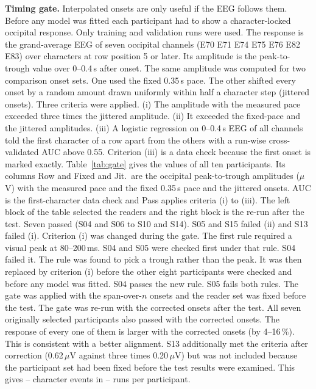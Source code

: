 \documentclass[sigconf]{acmart}
\begin{document}
\textbf{Timing gate.} Interpolated onsets are only useful if the EEG follows them. Before any model was fitted each participant had to show a character-locked occipital response. Only training and validation runs were used. The response is the grand-average EEG of seven occipital channels (E70 E71 E74 E75 E76 E82 E83) over characters at row position 5 or later. Its amplitude is the peak-to-trough value over 0--0.4\,s after onset. The same amplitude was computed for two comparison onset sets. One used the fixed 0.35\,s pace. The other shifted every onset by a random amount drawn uniformly within half a character step (jittered onsets). Three criteria were applied. (i) The amplitude with the measured pace exceeded three times the jittered amplitude. (ii) It exceeded the fixed-pace and the jittered amplitudes. (iii) A logistic regression on 0--0.4\,s EEG of all channels told the first character of a row apart from the others with a run-wise cross-validated AUC above 0.55. Criterion (iii) is a data check because the first onset is marked exactly. Table~\ref{tab:gate} gives the values of all ten participants. Its columns Row and Fixed and Jit.\ are the occipital peak-to-trough amplitudes ($\mu$V) with the measured pace and the fixed 0.35\,s pace and the jittered onsets. AUC is the first-character data check and Pass applies criteria (i) to (iii). The left block of the table selected the readers and the right block is the re-run after the test. Seven passed (S04 and S06 to S10 and S14). S05 and S15 failed (ii) and S13 failed (i). Criterion (i) was changed during the gate. The first rule required a visual peak at 80--200\,ms. S04 and S05 were checked first under that rule. S04 failed it. The rule was found to pick a trough rather than the peak. It was then replaced by criterion (i) before the other eight participants were checked and before any model was fitted. S04 passes the new rule. S05 fails both rules. The gate was applied with the span-over-$n$ onsets and the reader set was fixed before the test. The gate was re-run with the corrected onsets after the test. All seven originally selected participants also passed with the corrected onsets. The response of every one of them is larger with the corrected onsets (by 4--16\,\%). This is consistent with a better alignment. S13 additionally met the criteria after correction (0.62\,$\mu$V against three times 0.20\,$\mu$V) but was not included because the participant set had been fixed before the test results were examined. This gives \charsMin--\charsMax{} character events in \runsMin--\runsMax{} runs per participant.
\end{document}

